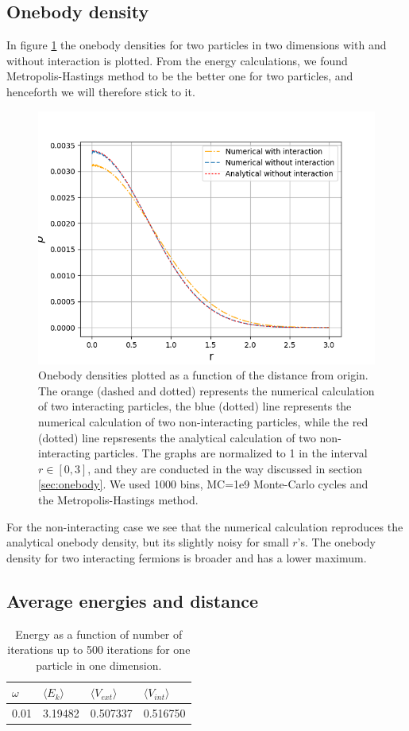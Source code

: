 \documentclass[norsk,a4paper,12pt]{article}
\begin{document}
\subsection{Onebody density}
In figure \ref{fig:OB} the onebody densities for two particles in two dimensions with and without interaction is plotted. From the energy calculations, we found Metropolis-Hastings method to be the better one for two particles, and henceforth we will therefore stick to it. 
 \begin{figure} [H]
 	\centering
 	\includegraphics[scale=0.8]{plots/OB_comparison_MC_1e9.png}
 	\caption{Onebody densities plotted as a function of the distance from origin. The orange (dashed and dotted) represents the numerical calculation of two interacting particles, the blue (dotted) line represents the numerical calculation of two non-interacting particles, while the red (dotted) line repsresents the analytical calculation of two non-interacting particles. The graphs are normalized to 1 in the interval $r\in[0,3]$, and they are conducted in the way discussed in section \ref{sec:onebody}. We used 1000 bins, MC=1e9 Monte-Carlo cycles and the Metropolis-Hastings method.}
 	\label{fig:OB}
 \end{figure}
For the non-interacting case we see that the numerical calculation reproduces the analytical onebody density, but its slightly noisy for small $r$'s. The onebody density for two interacting fermions is broader and has a lower maximum.
 

\subsection{Average energies and distance}
\begin{table} [H]
	\caption{Energy as a function of number of iterations up to 500 iterations for one particle in one dimension. \vspace{2mm}}
	\begin{tabularx}{\textwidth}{X|XXX} \hline\hline
		\label{tab:average_energies}
		$\omega$ & $\langle E_k\rangle$ & $\langle V_{ext}\rangle$ & $\langle V_{int}\rangle$ \\ \hline
				0.01 & 3.19482 & 0.507337 & 0.516750 \\ \hline
	\end{tabularx}
\end{table}
\end{document}
